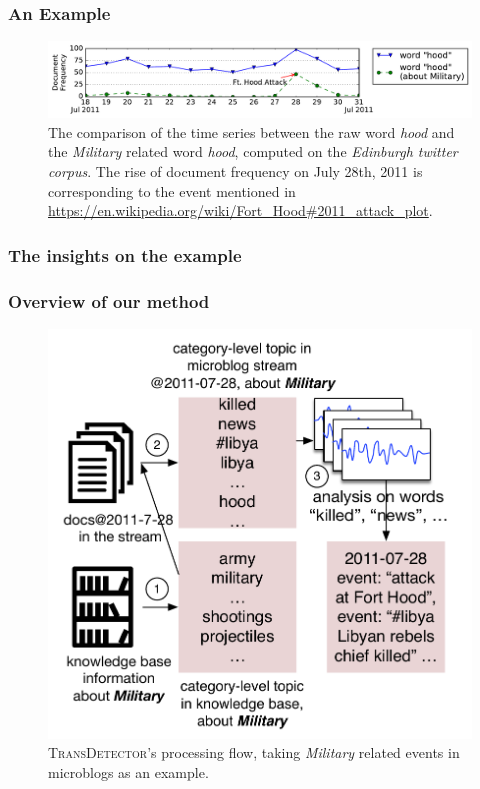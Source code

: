 \documentclass{beamer}
\begin{document}
\begin{frame}
\frametitle{An Example}	
\begin{figure}[h]
		\setlength{\abovecaptionskip}{0.cm}
        \setlength{\belowcaptionskip}{0.cm}
        \centering
        \includegraphics[width=1.0\columnwidth]{../img/hood.pdf}
        \caption{The comparison of the time series between the raw word \textit{hood} and the \textit{Military} related word \textit{hood}, computed on the \textit{Edinburgh twitter corpus}. The rise of document frequency on July 28th, 2011 is corresponding to the event mentioned in \url{https://en.wikipedia.org/wiki/Fort_Hood\#2011_attack_plot}.}
        \label{fig:hood}
\end{figure}
\end{frame}

\begin{frame}
\frametitle{The insights on the example}	

\end{frame}


\begin{frame}
\frametitle{Overview of our method}	

\begin{figure}[h]
		\setlength{\abovecaptionskip}{0.cm}
        \setlength{\belowcaptionskip}{0.cm}
        \centering
        \includegraphics[width=0.5\columnwidth]{../img/NSDetectorExample.pdf}
        \caption{\textsc{TransDetector}'s processing flow, taking \textit{Military} related events in microblogs as an example.}
        \label{fig:hood}
\end{figure}


\end{frame}
\end{document}
